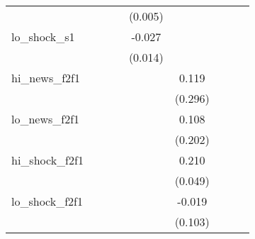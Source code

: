 {\begin{tabular}{l*{8}{c}}
            &                     &                     &                     &     (0.005)         &                     &                     &                     &                     \\
\addlinespace
lo\_shock\_s1 &                     &                     &                     &      -0.027\sym{*}  &                     &                     &                     &                     \\
            &                     &                     &                     &     (0.014)         &                     &                     &                     &                     \\
\addlinespace
hi\_news\_f2f1&                     &                     &                     &                     &       0.119         &                     &                     &                     \\
            &                     &                     &                     &                     &     (0.296)         &                     &                     &                     \\
\addlinespace
lo\_news\_f2f1&                     &                     &                     &                     &       0.108         &                     &                     &                     \\
            &                     &                     &                     &                     &     (0.202)         &                     &                     &                     \\
\addlinespace
hi\_shock\_f2f1&                     &                     &                     &                     &       0.210\sym{***}&                     &                     &                     \\
            &                     &                     &                     &                     &     (0.049)         &                     &                     &                     \\
\addlinespace
lo\_shock\_f2f1&                     &                     &                     &                     &      -0.019         &                     &                     &                     \\
            &                     &                     &                     &                     &     (0.103)         &                     &                     &                     \\

\end{tabular}}
